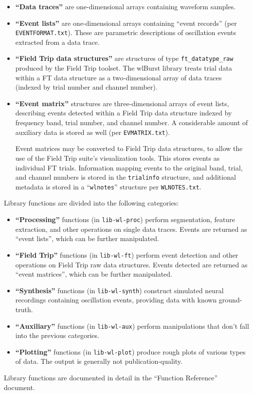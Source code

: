 \begin{itemize}
%
\item \textbf{``Data traces''} are one-dimensional arrays containing
waveform samples.
%
\item \textbf{``Event lists''} are one-dimensional arrays containing
``event records'' (per \texttt{EVENTFORMAT.txt}). These are parametric
descriptions of oscillation events extracted from a data trace.
%
\item \textbf{``Field Trip data structures''} are structures of type
\texttt{ft\_datatype\_raw} produced by the Field Trip toolset. The wlBurst
library treats trial data within a FT data structure as a two-dimensional
array of data traces (indexed by trial number and channel number).
%
\item \textbf{``Event matrix''} structures are three-dimensional arrays
of event lists, describing events detected within a Field Trip data structure
indexed by frequency band, trial number, and channel number. A considerable
amount of auxiliary data is stored as well (per \texttt{EVMATRIX.txt}).

Event matrices may be converted to Field Trip data structures, to allow
the use of the Field Trip suite's visualization tools. This stores events
as individual FT trials. Information mapping events to the original band,
trial, and channel numbers is stored in the \texttt{trialinfo} structure,
and additional metadata is stored in a ``\texttt{wlnotes}'' structure
per \texttt{WLNOTES.txt}.
%
\end{itemize}

Library functions are divided into the following categories:

\begin{itemize}
%
\item \textbf{``Processing''} functions (in \texttt{lib-wl-proc})
perform segmentation, feature extraction, and other operations on single
data traces. Events are returned as ``event lists'', which can be further
manipulated.
%
\item \textbf{``Field Trip''} functions (in \texttt{lib-wl-ft})
perform event detection and other operations on Field Trip raw data
structures. Events detected are returned as ``event matrices'', which can
be further manipulated.
%
\item \textbf{``Synthesis''} functions (in \texttt{lib-wl-synth})
construct simulated neural recordings containing oscillation events,
providing data with known ground-truth.
%
\item \textbf{``Auxiliary''} functions (in \texttt{lib-wl-aux})
perform manipulations that don't fall into the previous categories.
%
\item \textbf{``Plotting''} functions (in \texttt{lib-wl-plot})
produce rough plots of various types of data. The output is generally not
publication-quality.
%
\end{itemize}

Library functions are documented in detail in the ``Function Reference''
document.

%

